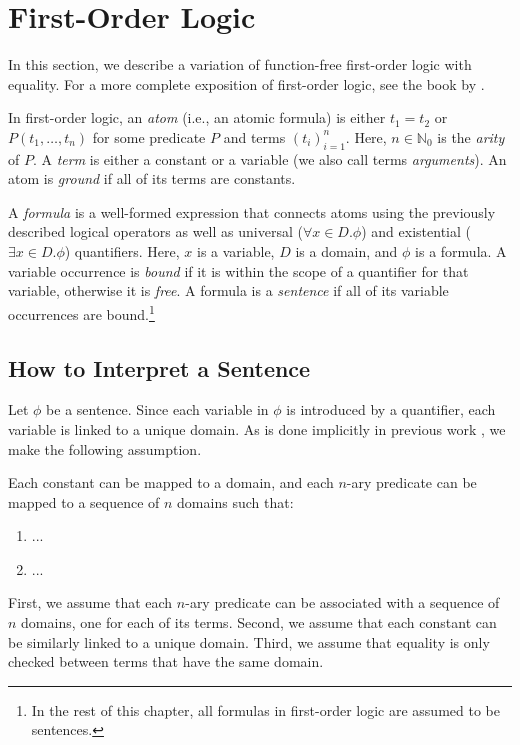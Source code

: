 \documentclass{article}
\theoremstyle{definition}
\theoremstyle{remark}
\begin{document}
\section{First-Order Logic}

In this section, we describe a variation of function-free first-order logic with equality. For a more complete exposition of first-order logic, see the book by \cite{DBLP:books/daglib/0023546}.

In first-order logic, an \emph{atom} (i.e., an atomic formula) is either $t_1 = t_2$ or $P(t_1, \dots, t_n)$ for some predicate $P$ and terms $(t_i)_{i=1}^n$. Here, $n \in \mathbb{N}_0$ is the \emph{arity} of $P$. A \emph{term} is either a constant or a variable (we also call terms \emph{arguments}). An atom is \emph{ground} if all of its terms are constants.

A \emph{formula} is a well-formed expression that connects atoms using the previously described logical operators as well as universal ($\forall x \in D. \phi$) and existential ($\exists x \in D. \phi$) quantifiers. Here, $x$ is a variable, $D$ is a domain, and $\phi$ is a formula. A variable occurrence is \emph{bound} if it is within the scope of a quantifier for that variable, otherwise it is \emph{free}. A formula is a \emph{sentence} if all of its variable occurrences are bound.\footnote{In the rest of this chapter, all formulas in first-order logic are assumed to be sentences.}

\subsection{How to Interpret a Sentence}

Let $\phi$ be a sentence. Since each variable in $\phi$ is introduced by a quantifier, each variable is linked to a unique domain. As is done implicitly in previous work \citep{DBLP:phd/basesearch/VandenBroeck13}, we make the following assumption.

\begin{assumption}
  Each constant can be mapped to a domain, and each $n$-ary predicate can be mapped to a sequence of $n$ domains such that:
  \begin{enumerate}
  \item ...
  \item ...
  \end{enumerate}
\end{assumption}

First, we assume that each $n$-ary predicate can be associated with a sequence of $n$ domains, one for each of its terms. Second, we assume that each constant can be similarly linked to a unique domain. Third, we assume that equality is only checked between terms that have the same domain.
\end{document}
